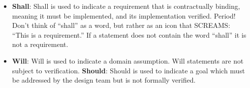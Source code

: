 \begin{itemize}
    \item \textbf{Shall}: Shall is used to indicate a requirement that is contractually binding, meaning it must be implemented, and its implementation verified.  Period!  Don’t think of “shall” as a word, but rather as an icon that SCREAMS: “This is a requirement.”  If a statement does not contain the word “shall” it is not a requirement.
    \item \textbf{Will}: Will is used to indicate a domain assumption.  Will statements are not subject to verification.
    \textbf{Should}: Should is used to indicate a goal which must be addressed by the design team but is not formally verified.
\end{itemize}

